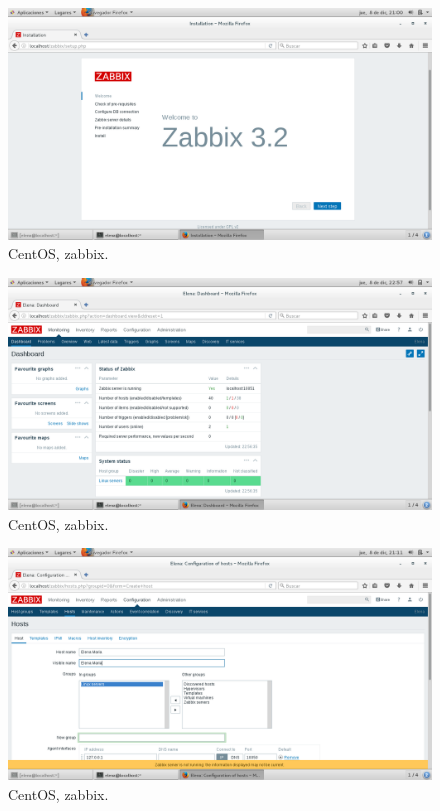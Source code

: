 \begin{figure}[H] 
	\centering
	\includegraphics[width=14.7cm]{./img/opcional4_3.png} 	
	\caption{CentOS, zabbix.} \label{fig:opcional4_3}
\end{figure}

\begin{figure}[H] 
	\centering
	\includegraphics[width=14.7cm]{./img/opcional4_4.png} 	
	\caption{CentOS, zabbix.} \label{fig:opcional4_4}
\end{figure}

\begin{figure}[H] 
	\centering
	\includegraphics[width=14.7cm]{./img/opcional4_5.png} 	
	\caption{CentOS, zabbix.} \label{fig:opcional4_5}
\end{figure}

